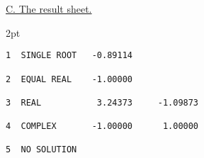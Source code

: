 \documentclass[10pt, a4paper, oneside]{article}
\newcommand{\myuline}[1]{\uline{#1}}
\newcommand{\listingLeft}{1cm}
\newcommand{\listingRight}{2pt}
\begin{document}
\myuline{C. The result sheet.}

\begin{framed}
\scriptsize
\begin{addmargin}[\listingLeft]{\listingRight}
\begin{lstlisting}
1  SINGLE ROOT   -0.89114

2  EQUAL REAL    -1.00000

3  REAL           3.24373     -1.09873

4  COMPLEX       -1.00000      1.00000

5  NO SOLUTION
\end{lstlisting}
\end{addmargin}
\end{framed}

\label{fig:ex1}
\endgroup


\newpage
\end{document}
